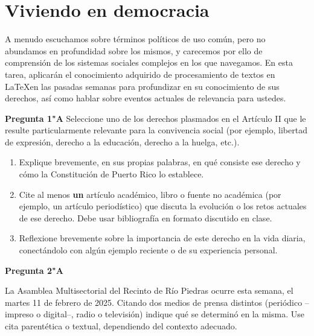 \documentclass[11pt]{article}
\begin{document}
\section{Viviendo en democracia}
A menudo escuchamos sobre términos políticos de uso común, pero no abundamos en profundidad sobre los mismos, y carecemos por ello de comprensión de los sistemas sociales complejos en los que navegamos. En esta tarea, aplicarán el conocimiento adquirido de procesamiento de textos en \LaTeX en las pasadas semanas para profundizar en su conocimiento de sus derechos, así como hablar sobre eventos actuales de relevancia para ustedes.

\textbf{Pregunta 1"A}
Seleccione uno de los derechos plasmados en el Artículo II \citep{ConstitucionPR} que le resulte particularmente relevante para la convivencia social (por ejemplo, libertad de expresión, derecho a la educación, derecho a la huelga, etc.). 

\begin{enumerate}
    \item Explique brevemente, en sus propias palabras, en qué consiste ese derecho y cómo la Constitución de Puerto Rico lo establece.
    \item Cite al menos \textbf{un} artículo académico, libro o fuente no académica (por ejemplo, un artículo periodístico) que discuta la evolución o los retos actuales de ese derecho. Debe usar bibliografía en formato discutido en clase.
    \item Reflexione brevemente sobre la importancia de este derecho en la vida diaria, conectándolo con algún ejemplo reciente o de su experiencia personal.
\end{enumerate}

\textbf{Pregunta 2"A}

La Asamblea Multisectorial del Recinto de Río Piedras ocurre esta semana, el martes 11 de febrero de 2025. Citando dos medios de prensa distintos (periódico --impreso o digital--, radio o televisión) indique qué se determinó en la misma. Use cita parentética o textual, dependiendo del contexto adecuado.


\printbibliography
\end{document}
